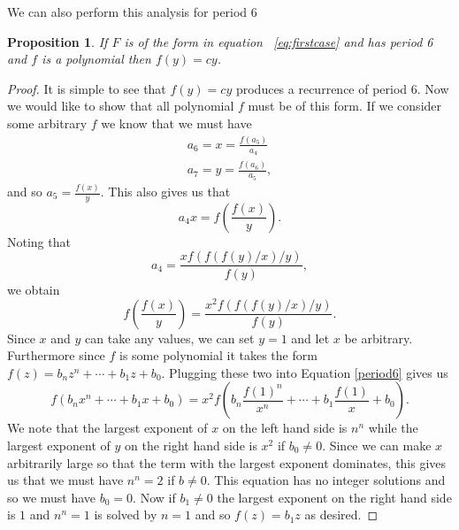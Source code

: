 \documentclass[12pt]{article}
\newtheorem{proposition}{Proposition}
\begin{document}
We can also perform this analysis for period $6$  
\begin{proposition}
If $F$ is of the form in equation ~\ref{eq:firstcase} and has period 6 and $f$ is a polynomial then $f(y) = cy$. 
\end{proposition}
\begin{proof} 
It is simple to see that $f(y)=cy$ produces a recurrence of period 6. Now we would like to show that all polynomial $f$ must be of this form. If we consider some arbitrary $f$ we know that we must have 
\begin{align*}
a_6 =x = \frac{f(a_5)}{a_4} \\ 
a_7 = y = \frac{f(a_6)}{a_5},
\end{align*}
and so $a_5 = \frac{f(x)}{y}$. This also gives us that 
\begin{equation*}
a_4 x = f\left( \frac{f(x)}{y} \right).
\end{equation*}
Noting that 
\begin{equation*}
a_4 = \frac{ x f(f(f(y)/x)/y)}{f(y)}, 
\end{equation*}
we obtain 
\begin{equation}
\label{period6}
 f\left( \frac{f(x)}{y} \right) = \frac{ x^2 f(f(f(y)/x)/y)}{f(y)}.
\end{equation}
Since $x$ and $y$ can take any values, we can set $y=1$ and let $x$ be arbitrary. Furthermore since $f$ is some polynomial it takes the form $f(z) = b_n z^n + \cdots + b_1 z +b_0$. Plugging these two into Equation \ref{period6} gives us 
\begin{equation*}
f(b_n x^n + \cdots + b_1 x + b_0) = x^2 f\left( b_n \frac{f(1)^n}{x^n} + \cdots + b_1 \frac{f(1)}{x} + b_0 \right).
\end{equation*}
We note that the largest exponent of $x$ on the left hand side is $n^n$ while the largest exponent of $y$ on the right hand side is $x^2$ if $b_0 \neq 0$. Since we can make $x$ arbitrarily large so that the term with the largest exponent dominates, this gives us that we must have $n^n=2$ if $b \neq 0$. This equation has no integer solutions and so we must have $b_0 =0$. Now if $b_1 \neq 0$ the largest exponent on the right hand side is $1$ and $n^n=1$ is solved by $n=1$ and so $f(z) = b_1 z$ as desired. 
\end{proof}
\end{document}
